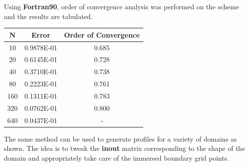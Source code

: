 				\noindent
				Using \textbf{Fortran90}, order of convergence analysis was performed on the scheme and the results are tabulated.\\
				\begin{center}
					\begin{tabular}{|c|c|c|}
						\hline
						N & Error & Order of Convergence\\
						\hline
						10 & 0.9878E-01 & 0.685 \\
						\hline
						20 & 0.6145E-01 & 0.728 \\
						\hline	
						40 & 0.3710E-01 & 0.738 \\
						\hline	
						80 & 0.2223E-01 & 0.761 \\
						\hline	
						160 & 0.1311E-01 & 0.783 \\
						\hline	
						320 & 0.0762E-01 & 0.800  \\
						\hline
						640 & 0.0437E-01 & -\\
						\hline
						\end{tabular}
						\end{center}
						
						\noindent
						The same method can be used to generate profiles for a variety of domains as shown. The idea is to tweak the \textbf{inout} matrix corresponding to the shape of the domain and appropriately take care of the immersed boundary grid points.\\
						
